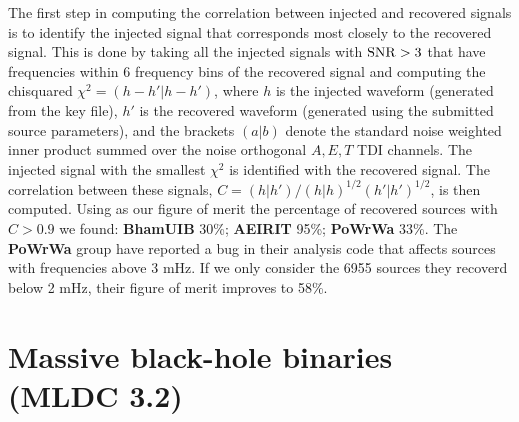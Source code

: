 \documentclass{iopart}
\begin{document}
The first step in computing the correlation between injected and recovered
signals is to identify the injected signal that corresponds most closely
to the recovered signal. This is done by taking all the injected signals
with ${\rm SNR} > 3$ that have frequencies within 6 frequency bins of the
recovered signal and computing the chisquared $\chi^2 = (h-h' \vert h- h')$,
where $h$ is the injected waveform (generated from the key file),
$h'$ is the recovered waveform (generated using the submitted source
parameters), and the brackets $(a\vert b)$ denote the standard noise weighted
inner product summed over the noise orthogonal $A,E,T$ TDI channels.
The injected signal with the smallest $\chi^2$ is identified with the
recovered signal. The correlation between these signals, $C= (h \vert h')/
(h\vert h)^{1/2} (h' \vert h')^{1/2}$, is then computed. Using as our
figure of merit the percentage of recovered sources with $C > 0.9$ we
found: \textbf{BhamUIB} 30\%; \textbf{AEIRIT} 95\%; \textbf{PoWrWa} 33\%.
The \textbf{PoWrWa} group have reported a bug in their analysis
code that affects sources with frequencies above 3 mHz. If we only
consider the 6955 sources they recoverd below 2 mHz, their figure of
merit improves to 58\%.

\section{Massive black-hole binaries (MLDC 3.2)}
\end{document}
